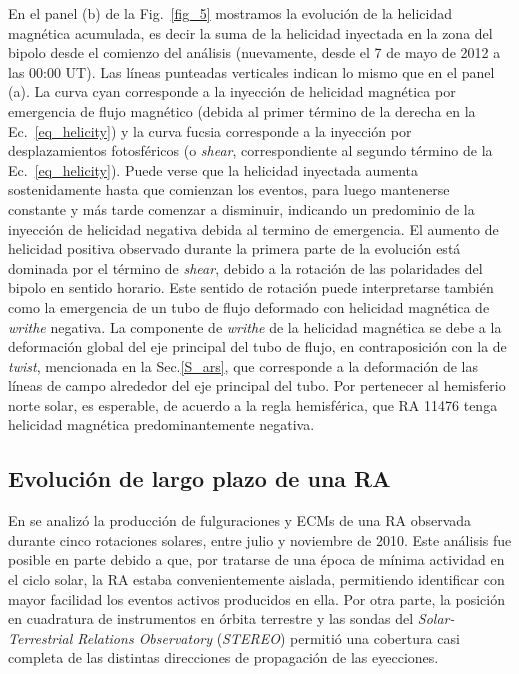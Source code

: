 \documentclass[baaa]{baaa}
\begin{document}
En el panel (b) de la Fig.~\ref{fig_5} mostramos la evolución de la helicidad magnética acumulada, es decir la suma de la helicidad inyectada en la zona del bipolo desde el comienzo del análisis (nuevamente, desde el 7 de mayo de 2012 a las 00:00 UT). Las líneas punteadas verticales indican lo mismo que en el panel (a). La curva cyan corresponde a la inyección de helicidad magnética por emergencia de flujo magnético (debida al primer término de la derecha en la Ec.~\ref{eq_helicity}) y la curva fucsia corresponde a la inyección por desplazamientos fotosféricos (o {\sl shear}, correspondiente al segundo término de la Ec.~\ref{eq_helicity}). Puede verse que la helicidad inyectada aumenta sostenidamente hasta que comienzan los eventos, para luego mantenerse constante y más tarde comenzar a disminuir, indicando un predominio de la inyección de helicidad negativa debida al termino de emergencia. El aumento de helicidad positiva observado durante la primera parte de la evolución está dominada por el término de {\sl shear}, debido a la rotación de las polaridades del bipolo en sentido horario. Este sentido de rotación puede interpretarse también como la emergencia de un tubo de flujo deformado con helicidad magnética de {\sl writhe} negativa. La componente de {\sl writhe} de la helicidad magnética se debe a la deformación global del eje principal del tubo de flujo, en contraposición con la de {\sl twist}, mencionada en la Sec.\ref{S_ars}, que corresponde a la deformación de las líneas de campo alrededor del eje principal del tubo. Por pertenecer al hemisferio norte solar, es esperable, de acuerdo a la regla hemisférica, que RA 11476 tenga helicidad magnética predominantemente negativa.

\subsection{Evolución de largo plazo de una RA}

En \citet{iglesias2020} se analizó la producción de fulguraciones y ECMs de una RA observada durante cinco rotaciones solares, entre julio y noviembre de 2010. Este análisis fue posible en parte debido a que, por tratarse de una época de mínima actividad en el ciclo solar, la RA estaba convenientemente aislada, permitiendo identificar con mayor facilidad los eventos activos producidos en ella. Por otra parte, la posición en cuadratura de instrumentos en órbita terrestre y las sondas del {\sl Solar-Terrestrial Relations Observatory} ({\sl STEREO}) permitió una cobertura casi completa de las distintas direcciones de propagación de las eyecciones.
\end{document}
